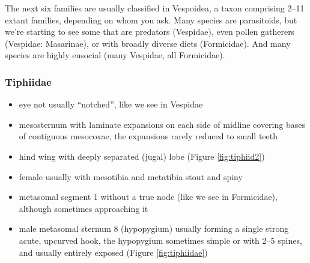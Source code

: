 \documentclass[letterpaper, 11pt]{article}
\begin{document}
\noindent{}The next six families are usually classified in Vespoidea, a taxon comprising 2--11 extant families, depending on whom you ask. Many species are parasitoids, but we're starting to see some that are predators (Vespidae), even pollen gatherers (Vespidae: Masarinae), or with broadly diverse diets (Formicidae). And many species are highly eusocial (many Vespidae, all Formicidae). 

\subsubsection{Tiphiidae}
\begin{itemize}
\item eye not usually ``notched'', like we see in Vespidae
\item mesosternum with laminate expansions on each side of midline covering bases of contiguous mesocoxae, the expansions rarely reduced to small teeth
\item hind wing with deeply separated (jugal) lobe (Figure \ref{fig:tiphiid2})
\item female usually with mesotibia and metatibia stout and spiny
\item metasomal segment 1 without a true node (like we see in Formicidae), although sometimes approaching it
\item male metasomal sternum 8 (hypopygium) usually forming a single strong acute, upcurved hook, the hypopygium sometimes simple or with 2--5 spines, and usually entirely exposed (Figure \ref{fig:tiphiidae})
\end{itemize}
\end{document}
